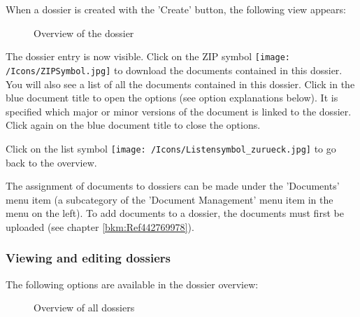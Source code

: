 \vspace{\baselineskip}

When a dossier is created with the 'Create' button, the following view appears:

\begin{figure}[H]
\caption{Overview of the dossier}
\end{figure}

The dossier entry is now visible. Click on the ZIP symbol \texttt{[image: /Icons/ZIPSymbol.jpg]}  to download the documents contained in this dossier. You will also see a list of all the documents contained in this dossier. Click in the blue document title  to open the options (see option explanations below). It is specified which major or minor versions of the document is linked to the dossier. Click again on the blue document title to close the options.

Click on the list symbol \texttt{[image: /Icons/Listensymbol\_zurueck.jpg]}  to go back to the overview.

\vspace{\baselineskip}

The assignment of documents to dossiers can be made under the 'Documents' menu item (a subcategory of the 'Document Management' menu item in the menu on the left). To add documents to a dossier, the documents must first be uploaded (see chapter \ref{bkm:Ref442769978}).

\subsubsection{Viewing and editing dossiers}

The following options are available in the dossier overview:

\begin{figure}[H]
\caption{Overview of all dossiers}
\end{figure}

